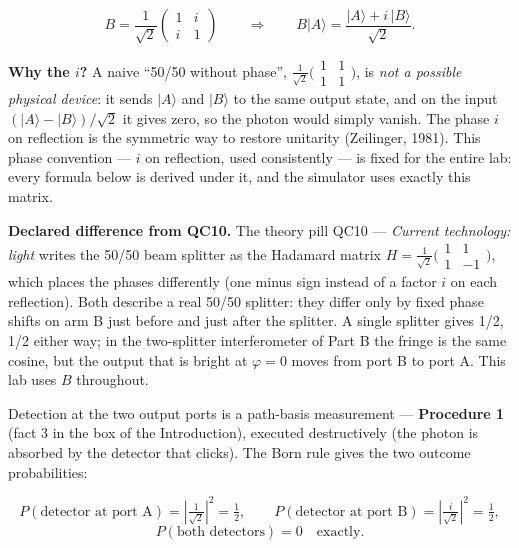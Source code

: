\documentclass[a4paper,11pt]{article}
\providecommand{\ket}[1]{|#1\rangle}
\begin{document}
\begin{equation}
    B = \frac{1}{\sqrt{2}}\begin{pmatrix} 1 & i \\ i & 1 \end{pmatrix}
    \qquad\Longrightarrow\qquad
    B\ket{A} = \frac{\ket{A} + i\,\ket{B}}{\sqrt{2}}.
    \label{eq:bs}
\end{equation}

\begin{theorybox}
\textbf{Why the $i$?} A naive ``50/50 without phase'',
$\tfrac{1}{\sqrt 2}\bigl(\begin{smallmatrix}1&1\\1&1\end{smallmatrix}\bigr)$, is
\emph{not a possible physical device}: it sends $\ket{A}$ and $\ket{B}$ to the same
output state, and on the input $(\ket{A} - \ket{B})/\sqrt 2$ it gives zero, so the
photon would simply vanish. The phase $i$ on reflection is the symmetric way to
restore unitarity (Zeilinger, 1981). This phase convention --- $i$ on reflection, used
consistently --- is fixed for the entire lab: every formula below is derived under it,
and the simulator uses exactly this matrix.

\medskip
\textbf{Declared difference from QC10.} The theory pill QC10 --- \textit{Current
technology: light} writes the 50/50 beam splitter as the Hadamard matrix
$H = \tfrac{1}{\sqrt 2}\bigl(\begin{smallmatrix}1&1\\1&-1\end{smallmatrix}\bigr)$,
which places the phases differently (one minus sign instead of a factor $i$ on each
reflection). Both describe a real 50/50 splitter: they differ only by fixed phase
shifts on arm B just before and just after the splitter. A single splitter gives 1/2,
1/2 either way; in the two-splitter interferometer of Part B the fringe is the same
cosine, but the output that is bright at $\varphi = 0$ moves from port B to port A.
This lab uses $B$ throughout.
\end{theorybox}

Detection at the two output ports is a path-basis measurement ---
\textbf{Procedure 1} (fact 3 in the box of the Introduction), executed destructively (the photon is absorbed by
the detector that clicks). The Born rule gives the two outcome probabilities:

\begin{equation}
    P(\text{detector at port A}) = \left|\tfrac{1}{\sqrt 2}\right|^2 = \tfrac12,
    \qquad
    P(\text{detector at port B}) = \left|\tfrac{i}{\sqrt 2}\right|^2 = \tfrac12,
    \label{eq:bsprobs}
\end{equation}
\begin{equation}
    P(\text{both detectors}) = 0 \quad\text{exactly.}
    \label{eq:anticorr}
\end{equation}
\end{document}
